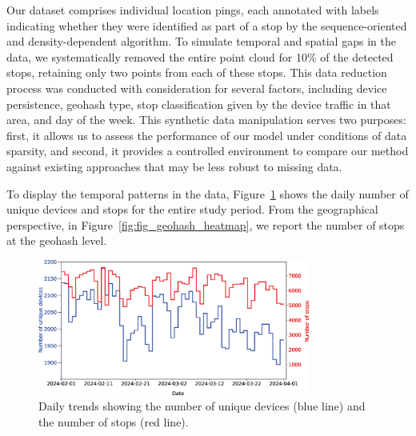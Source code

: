 \documentclass{article}
\begin{document}
Our dataset comprises individual location pings, each annotated with labels indicating whether they were identified as part of a stop by the sequence-oriented and density-dependent algorithm. To simulate temporal and spatial gaps in the data, we systematically removed the entire point cloud for 10\% of the detected stops, retaining only two points from each of these stops. This data reduction process was conducted with consideration for several factors, including device persistence, geohash type, stop classification given by the device traffic in that area, and day of the week.
This synthetic data manipulation serves two purposes: first, it allows us to assess the performance of our model under conditions of data sparsity, and second, it provides a controlled environment to compare our method against existing approaches that may be less robust to missing data.

To display the temporal patterns in the data,  Figure~\ref{fig:fig_trend} shows the daily number of unique devices and stops for the entire study period. From the geographical perspective, in Figure~\ref{fig:fig_geohash_heatmap}, we report the number of stops at the geohash level. 

\begin{figure}[ht]
    \includegraphics[width=0.8\textwidth]{./Images/figure_trends.eps}
	\centering
	\caption{Daily trends showing the number of unique devices (blue line) and the number of stops (red line).}
	\label{fig:fig_trend}
\end{figure}
\end{document}
